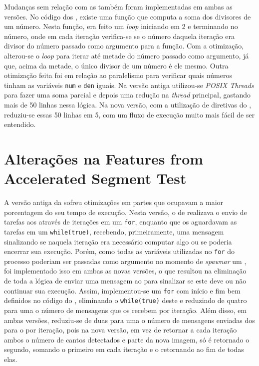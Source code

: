 Mudanças sem relação com as \APIs também foram implementadas em ambas as versões. No código dos \slaves, existe uma função que computa a soma dos divisores de um número. Nesta função, era feito um \textit{loop} iniciando em 2 e terminando no número, onde em cada iteração verifica-se se o número daquela iteração era divisor do número passado como argumento para a função. Com a otimização, alterou-se o \textit{loop} para iterar até metade do número passado como argumento, já que, acima da metade, o único divisor de um número é ele mesmo. Outra otimização feita foi em relação ao paralelismo para verificar quais números tinham as variáveis \texttt{num} e \texttt{den} iguais. Na versão antiga utilizou-se \textit{POSIX Threads} para fazer uma soma parcial e depois uma redução na \textit{thread} principal, gastando mais de 50 linhas nessa lógica. Na nova versão, com a utilização de diretivas do \OpenMP, reduziu-se essas 50 linhas em 5, com um fluxo de execução muito mais fácil de ser entendido.

\section{Alterações na Features from Accelerated Segment Test}
\label{sec:alteracoesfast}

A versão antiga da \FAST sofreu otimizações em partes que ocupavam a maior porcentagem do seu tempo de execução. Nesta versão, o \cluster de \IO realizava o envio de tarefas aos \CCs através de iterações em um \texttt{for}, enquanto que os \CCs aguardavam as tarefas em um \texttt{while(true)}, recebendo, primeiramente, uma mensagem sinalizando se naquela iteração era necessário computar algo ou se poderia encerrar sua execução. Porém, como todas as variáveis utilizadas no \texttt{for} do processo \master poderiam ser passadas como argumento no momento de \textit{spawnar} um \CC, foi implementado isso em ambas as novas versões, o que resultou na eliminação de toda a lógica de enviar uma mensagem ao \slave para sinalizar se este deve ou não continuar sua execução. Assim, implementou-se um \texttt{for} com início e fim bem definidos no código do \slave, eliminando o \texttt{while(true)} deste e reduzindo de quatro para uma o número de mensagens que os \slaves recebem por iteração. Além disso, em ambas versões, reduziu-se de duas para uma o número de mensagens enviadas dos \slaves para o \master por iteração, pois na nova versão, em vez de retornar a cada iteração ambos o número de cantos detectados e parte da nova imagem, só é retornado o segundo, somando o primeiro em cada iteração e o retornando ao fim de todas elas.

